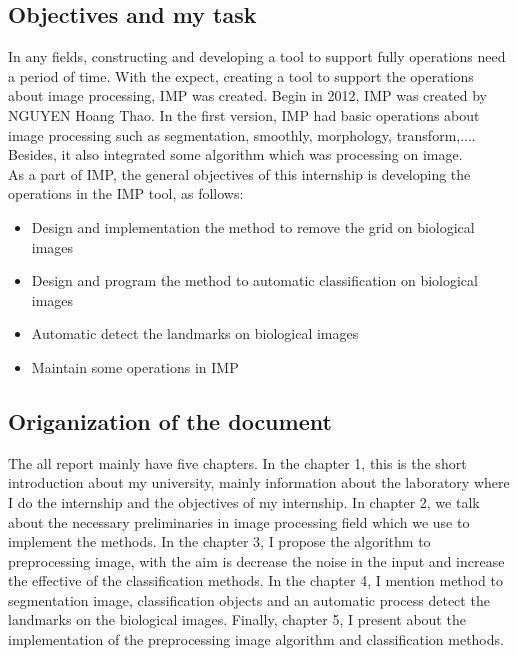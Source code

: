 \subsection{Objectives and my task}
In any fields, constructing and developing a tool to support fully operations need a period of time. With the expect, creating a tool to support the operations about image processing, IMP was created. Begin in 2012, IMP was created by NGUYEN Hoang Thao. In the first version, IMP had basic operations about image processing such as segmentation, smoothly, morphology, transform,.... Besides, it also integrated some algorithm which was processing on image.\\[0.2cm]
As a part of IMP, the general objectives of this internship is developing the operations in the IMP tool, as follows:
\begin{itemize}
\item Design and implementation the method to remove the grid on biological images
\item Design and program the method to automatic classification on biological images
\item Automatic detect the landmarks on biological images
\item Maintain some operations in IMP
\end{itemize}
\subsection{Origanization of the document}
The all report mainly have five chapters. In the chapter 1, this is the short introduction about my university, mainly information about the laboratory where I do the internship and the objectives of my internship. In chapter 2, we talk about the necessary preliminaries in image processing field which we use to implement the methods. In the chapter 3, I propose the algorithm to preprocessing image, with the aim is decrease the noise in the input and increase the effective of the classification methods. In the chapter 4, I mention method to segmentation image, classification objects and an automatic process detect the landmarks on the biological images. Finally, chapter 5, I present about the implementation of the preprocessing image algorithm and classification methods.






























